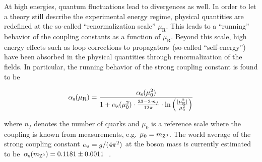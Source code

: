 

At high energies, quantum fluctuations lead to divergences as well. In order to let a theory still describe the experimental energy regime, physical quantities are redefined at the so-called ``renormalization scale'' $\mu_\mathrm{R}$. This leads to a ``running'' behavior of the coupling constants as a function of $\mu_\mathrm{R}$. Beyond this scale, high energy effects such as loop corrections to propagators~(so-called ``self-energy'') have been absorbed in the physical quantities through renormalization of the fields. In particular, the running behavior of the strong coupling constant is found to be 

\begin{equation}
{\alpha_\mathrm{s}}(\mu_\mathrm{R})=\frac{{\alpha_\mathrm{s}}(\mu_{0}^{2})}{1+{\alpha_\mathrm{s}}(\mu_\mathrm{0}^2)\cdot\tfrac{33-2\cdot n_f}{12\pi}\cdot\ln\Big(\tfrac{|\mu_\mathrm{R}^2|}{\mu_{0}^{2}}\Big)}
\end{equation}

where $n_f$ denotes the number of quarks and $\mu_{0}$ is a reference scale where the coupling is known from measurements, e.g. $\mu_{0}=m_{{\mathrm{Z}^{0}}}$. The world average of the strong coupling constant ${\alpha_\mathrm{s}}=g/(4\pi^2)$ at the \zboson boson mass is currently estimated to be ${\alpha_\mathrm{s}}(m_{{\mathrm{Z}^{0}}})=0.1181\pm0.0011$~\cite{Olive:2016xmw}. 

